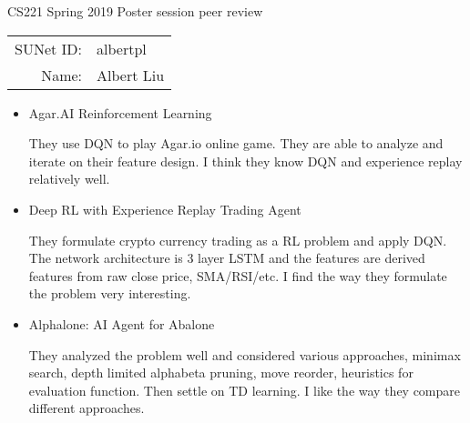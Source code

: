 \documentclass[12pt]{article}
\begin{document}
\begin{center}
{\Large CS221 Spring 2019 Poster session peer review}

\begin{tabular}{rl}
SUNet ID: & albertpl \\
Name: & Albert Liu \\
\end{tabular}
\end{center}

\begin{itemize}
  \item  Agar.AI Reinforcement Learning

   They use DQN to play Agar.io online game. They are able to analyze and iterate on their feature design. I think they know DQN and experience replay relatively well.

\item
  Deep RL with Experience Replay Trading Agent

  They formulate crypto currency trading as a RL problem and apply DQN. The network architecture is 3 layer LSTM and the features are derived features from raw close price, SMA/RSI/etc. I find the way they formulate the problem very interesting.


\item
  Alphalone: AI Agent for Abalone

  They analyzed the problem well and considered various approaches, minimax search, depth limited alphabeta pruning, move reorder, heuristics for evaluation function. Then settle on TD learning. I like the way they compare different approaches.



\end{itemize}
\end{document}
